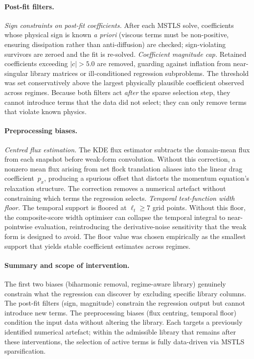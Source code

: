 \paragraph{Post-fit filters.}
\emph{Sign constraints on post-fit coefficients.}
After each MSTLS solve, coefficients whose physical sign is known
\emph{a priori} (viscous terms must be non-positive, ensuring
dissipation rather than anti-diffusion) are checked; sign-violating
survivors are zeroed and the fit is re-solved.
\emph{Coefficient magnitude cap.}
Retained coefficients exceeding $|c|>5.0$ are removed, guarding against
inflation from near-singular library matrices or ill-conditioned
regression subproblems.  The threshold was set conservatively above the
largest physically plausible coefficient observed across regimes.
Because both filters act \emph{after} the sparse selection step, they
cannot introduce terms that the data did not select; they can only
remove terms that violate known physics.

\paragraph{Preprocessing biases.}
\emph{Centred flux estimation.}
The KDE flux estimator subtracts the domain-mean flux from each snapshot
before weak-form convolution.  Without this correction, a nonzero mean
flux arising from net flock translation aliases into the linear drag
coefficient~$p_x$, producing a spurious offset that distorts the momentum
equation's relaxation structure.  The correction removes a numerical
artefact without constraining which terms the regression selects.
\emph{Temporal test-function width floor.}
The temporal support is floored at $\ell_t \geq 7$ grid points.  Without
this floor, the composite-score width optimiser can collapse the temporal
integral to near-pointwise evaluation, reintroducing the derivative-noise
sensitivity that the weak form is designed to avoid.  The floor value was
chosen empirically as the smallest support that yields stable coefficient
estimates across regimes.

\paragraph{Summary and scope of intervention.}
The first two biases (biharmonic removal, regime-aware library) genuinely
constrain what the regression can discover by excluding specific library
columns.  The post-fit filters (sign, magnitude) constrain the regression
output but cannot introduce new terms.  The preprocessing biases (flux
centring, temporal floor) condition the input data without altering the
library.  Each targets a previously identified numerical artefact; within
the admissible library that remains after these interventions, the
selection of active terms is fully data-driven via MSTLS sparsification.

